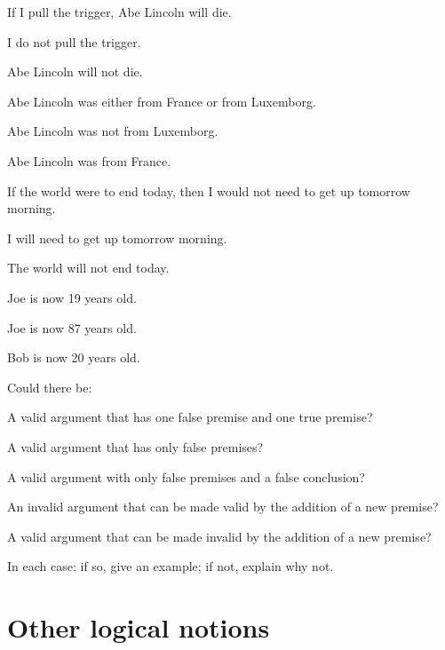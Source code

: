 \begin{earg}
\item If I pull the trigger, Abe Lincoln will die.
\item I do not pull the trigger.
\item[\therefore] Abe Lincoln will not die.
\end{earg}

\begin{earg}
\item Abe Lincoln was either from France or from Luxemborg.
\item Abe Lincoln was not from Luxemborg.
\item[\therefore] Abe Lincoln was from France.
\end{earg}

\begin{earg}
\item If the world were to end today, then I would not need to get up tomorrow morning.
\item I will need to get up tomorrow morning.
\item[\therefore] The world will not end today.
\end{earg}

\begin{earg}
\item Joe is now 19 years old.
\item Joe is now 87 years old.
\item[\therefore] Bob is now 20 years old.
\end{earg}

\problempart
\label{pr.EnglishCombinations}
Could there be:
	\begin{earg}
		\item A valid argument that has one false premise and one true premise?
		\item A valid argument that has only false premises?
		\item A valid argument with only false premises and a false conclusion?
		\item An invalid argument that can be made valid by the addition of a new premise?
		\item A valid argument that can be made invalid by the addition of a new premise?
	\end{earg}
In each case: if so, give an example; if not, explain why not.


\chapter{Other logical notions}\label{s:BasicNotions}

